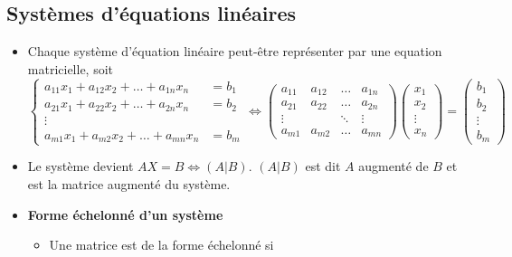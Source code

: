 \subsection*{Systèmes d'équations linéaires}
\begin{itemize}
    \item[] Chaque système d'équation linéaire peut-être représenter par une equation matricielle, soit \begin{equation*}
              \begin{cases}
                  a_{11}x_1 + a_{12}x_2 + \ldots + a_{1n}x_n & = b_1 \\
                  a_{21}x_1 + a_{22}x_2 + \ldots + a_{2n}x_n & = b_2 \\
                  \vdots                                             \\
                  a_{m1}x_1 + a_{m2}x_2 + \ldots + a_{mn}x_n & = b_m
              \end{cases} \iff \begin{pmatrix}
                  a_{11} & a_{12}      & \dots  & a_{1n} \\
                  a_{21} & a_{22}      & \dots  & a_{2n} \\
                  \vdots & \phantom{a} & \ddots & \vdots \\
                  a_{m1} & a_{m2}      & \dots  & a_{mn}
              \end{pmatrix} \begin{pmatrix}
                  x_1    \\
                  x_2    \\
                  \vdots \\
                  x_n
              \end{pmatrix} = \begin{pmatrix}
                  b_1    \\
                  b_2    \\
                  \vdots \\
                  b_m
              \end{pmatrix}
              \end{equation*}
    \item[] Le système devient $AX = B \iff (A|B)$. $(A|B)$ est dit $A$ augmenté de $B$ et est la matrice augmenté du système.
    \item[] \textbf{Forme échelonné d'un système} \begin{itemize}
              \item[] Une matrice est de la forme échelonné si \begin{enumerate}

\end{enumerate}
\end{itemize}
\end{itemize}
